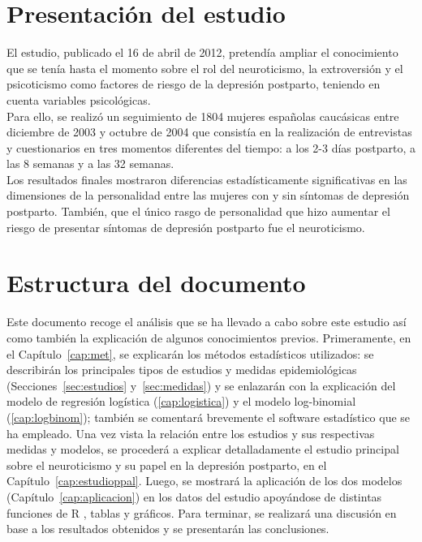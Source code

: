 \section{Presentación del estudio}
El estudio, publicado el 16 de abril de 2012, pretendía ampliar el conocimiento que se tenía hasta el momento sobre el rol del neuroticismo, la extroversión y el psicoticismo como factores de riesgo de la depresión postparto, teniendo en cuenta variables psicológicas. \\

Para ello, se realizó un seguimiento de 1804 mujeres españolas caucásicas entre diciembre de 2003 y octubre de 2004 que consistía en la realización de entrevistas y cuestionarios en tres momentos diferentes del tiempo: a los 2-3 días postparto, a las 8 semanas y a las 32 semanas.\\

Los resultados finales mostraron diferencias estadísticamente significativas en las dimensiones de la personalidad entre las mujeres con y sin síntomas de depresión postparto. También, que el único rasgo de personalidad que hizo aumentar el riesgo de presentar síntomas de depresión postparto fue el neuroticismo. \\

\section{Estructura del documento}
Este documento recoge  el análisis que se ha llevado a cabo sobre este estudio así como también la explicación de algunos conocimientos previos. Primeramente, en el Capítulo~\ref{cap:met}, se explicarán los métodos estadísticos utilizados: se describirán los principales tipos de estudios y medidas epidemiológicas (Secciones~\ref{sec:estudios} y~\ref{sec:medidas}) y se enlazarán con la explicación del modelo de regresión logística (\ref{cap:logistica}) y el modelo log-binomial (\ref{cap:logbinom}); también se comentará brevemente el software estadístico que se ha empleado. Una vez vista la relación entre los estudios y sus respectivas medidas y modelos, se procederá a explicar detalladamente el estudio principal sobre el neuroticismo y su papel en la depresión postparto, en el Capítulo~\ref{cap:estudioppal}. Luego, se mostrará la aplicación de los dos modelos (Capítulo~\ref{cap:aplicacion}) en los datos del estudio apoyándose de distintas funciones de R \autocite{R}, tablas y gráficos. Para terminar, se realizará una discusión en base a los resultados obtenidos  y se presentarán las conclusiones.

